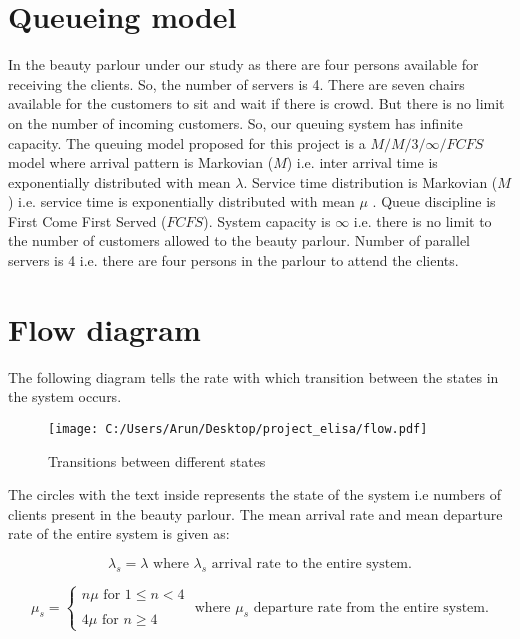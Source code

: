 \documentclass{article}
\theoremstyle{definition}
\begin{document}
\section{Queueing model}
In the beauty parlour under our study as there are four persons available for receiving the clients. So, the number of servers is 4. There are seven chairs available for the customers to sit and wait if there is crowd. But there is no limit on the number of incoming customers. So, our queuing system has infinite capacity. 
	The queuing model proposed for this project is a $ M/M/3/\infty/FCFS $ model where arrival pattern is Markovian ($M$) i.e. inter arrival time is exponentially distributed with mean $\lambda $. Service time distribution is Markovian ($M$) i.e. service time is exponentially distributed with mean 
 $\mu$ . Queue discipline is First Come First Served ($FCFS$). System capacity is $ \infty $ i.e. there is no limit to the number of customers allowed to the beauty parlour. Number of parallel servers is 4 i.e. there are four persons in the parlour to attend the clients.

\section{Flow diagram}

The following diagram tells the rate with which transition between the states in the system occurs.

\begin{figure}[H]
\texttt{[image: C:/Users/Arun/Desktop/project\_elisa/flow.pdf]}{\centering}
\caption{Transitions between different states}
\label{fig:flow}
\end{figure}

The circles with the text inside represents the state of the system i.e numbers of clients present in the beauty parlour. The mean arrival rate and mean departure rate of the entire system is given as:

\[
\lambda_s = \lambda \text{ where } \lambda_s \text{ arrival rate to the entire system.}
\]

 \[
    \mu_s=\left\{
                \begin{array}{ll}
                  n\mu  \text{ for } 1 \leq n < 4\\
                    \\
                  4\mu \text{ for } n\geq 4 
                \end{array}
              \right.
              \text{ where } \mu_s \text{ departure rate from the entire system.}
  \]
\end{document}
